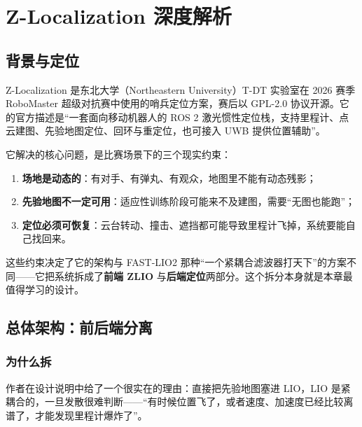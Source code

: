 \chapter{Z-Localization 深度解析}\label{ch:23-zlocalization}


\section{背景与定位}\label{sec:23-background}

Z-Localization 是东北大学（Northeastern University）T-DT 实验室在 2026 赛季 RoboMaster 超级对抗赛中使用的哨兵定位方案，赛后以 GPL-2.0 协议开源\cite{zloc2026}。它的官方描述是“一套面向移动机器人的 ROS 2 激光惯性定位栈，支持里程计、点云建图、先验地图定位、回环与重定位，也可接入 UWB 提供位置辅助”。

它解决的核心问题，是比赛场景下的三个现实约束：
\begin{enumerate}
  \item \textbf{场地是动态的}：有对手、有弹丸、有观众，地图里不能有动态残影；
  \item \textbf{先验地图不一定可用}：适应性训练阶段可能来不及建图，需要“无图也能跑”；
  \item \textbf{定位必须可恢复}：云台转动、撞击、遮挡都可能导致里程计飞掉，系统要能自己找回来。
\end{enumerate}

这些约束决定了它的架构与 FAST-LIO2 那种“一个紧耦合滤波器打天下”的方案不同——它把系统拆成了\textbf{前端 ZLIO} 与\textbf{后端定位}两部分。这个拆分本身就是本章最值得学习的设计。

\section{总体架构：前后端分离}\label{sec:23-arch}

\subsection{为什么拆}

作者在设计说明中给了一个很实在的理由：直接把先验地图塞进 LIO，LIO 是紧耦合的，一旦发散很难判断——“有时候位置飞了，或者速度、加速度已经比较离谱了，才能发现里程计爆炸了”。

